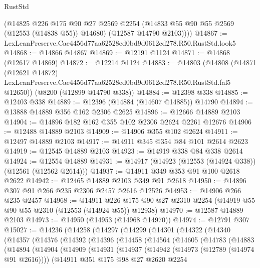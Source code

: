 \begin{lexlean}{RustStd}
\begin{coremodule}
        (@14825
          @226
          @175
          @90
          @27
          @2569
          @2254
          (@14833 @55 @90 @55 @2569 (@12553 (@14838 @55)) @14680)
          (@12587 @14790 @2103))))
@14867 := LexLeanPreserve.Cae4456d77aa62528ed0bd9d0612cd278.R50.RustStd.look5
@14868 := @14866 @14867
@14869 := @12191 @1124
@14871 := @14868 (@12617 @14869)
@14872 := @12214 @1124
@14883 := @14803
    (@14808
      (@14871
        (@12621 @14872)
        LexLeanPreserve.Cae4456d77aa62528ed0bd9d0612cd278.R50.RustStd.fal5
        @12650))
    (@8200 (@12899 @14790 @338))
@14884 := @12398 @338
@14885 := @12403 @338
@14889 := @12396 (@14884 (@14607 @14885)) @14790
@14894 := @13888 @14889 @356 @162 @2306 @2625
@14896 := @12666 @14889 @2103
@14904 := @14896 @182 @162 @355 @102 @2306 @2624 @2261 @12676
@14906 := @12488 @14889 @2103
@14909 := @14906 @355 @102 @2624
@14911 := @12497 @14889 @2103
@14917 := @14911 @345 @354 @84 @101 @2614 @2623
@14919 := @12545 @14889 @2103
@14923 := @14919 @338 @84 @338 @2614
@14924 := @12554 @14889
@14931 := @14917 (@14923 (@12553 (@14924 @338)) (@12561 (@12562 @2614)))
@14937 := @14911 @349 @353 @91 @100 @2618 @2622
@14942 := @12465 @14889 @2103 @349 @91 @2618
@14950 := @14896 @307 @91 @266 @235 @2306 @2457 @2616 @12526
@14953 := @14906 @266 @235 @2457
@14968 := @14911
    @226
    @175
    @90
    @27
    @2310
    @2254
    (@14919 @55 @90 @55 @2310 (@12553 (@14924 @55)) @12938)
@14970 := @12587 @14889 @2103
@14973 := @14950 (@14953 (@14968 @14970))
@14974 := @12791 @307
@15027 := @14236
    (@14258
      (@14297
        (@14299
          (@14301
            (@14322
              (@14340
                (@14357
                  (@14376
                    (@14392
                      (@14396
                        (@14458
                          (@14564
                            (@14605
                              (@14783
                                (@14883
                                  (@14894
                                    (@14904
                                      (@14909
                                        (@14931
                                          (@14937
                                            (@14942 (@14973 (@12789 (@14974 @91 @2616))))
                                            (@14911
                                              @351
                                              @175
                                              @98
                                              @27
                                              @2620
                                              @2254

\end{coremodule}
\end{lexlean}
